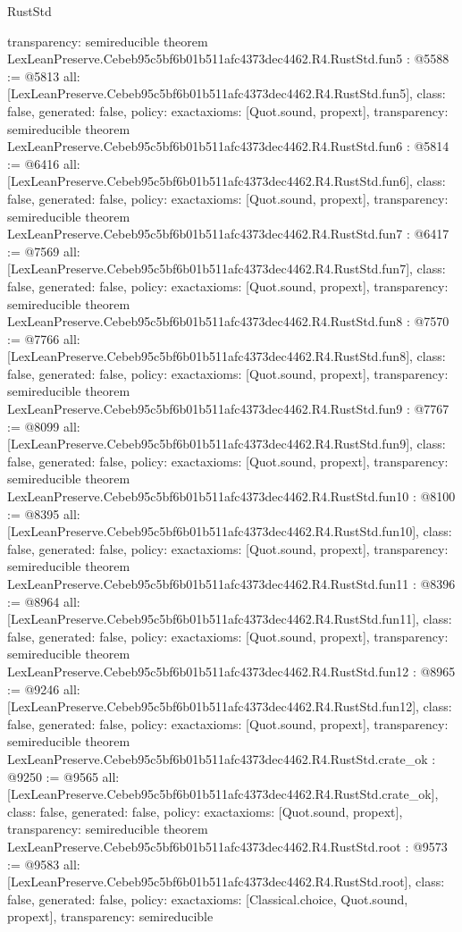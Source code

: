 \begin{lexlean}{RustStd}
\begin{coremodule}
{  transparency: semireducible
}
theorem LexLeanPreserve.Cebeb95c5bf6b01b511afc4373dec4462.R4.RustStd.fun5 : @5588 := @5813 {
  all: [LexLeanPreserve.Cebeb95c5bf6b01b511afc4373dec4462.R4.RustStd.fun5],
  class: false,
  generated: false,
  policy: exact{axioms: [Quot.sound, propext]},
  transparency: semireducible
}
theorem LexLeanPreserve.Cebeb95c5bf6b01b511afc4373dec4462.R4.RustStd.fun6 : @5814 := @6416 {
  all: [LexLeanPreserve.Cebeb95c5bf6b01b511afc4373dec4462.R4.RustStd.fun6],
  class: false,
  generated: false,
  policy: exact{axioms: [Quot.sound, propext]},
  transparency: semireducible
}
theorem LexLeanPreserve.Cebeb95c5bf6b01b511afc4373dec4462.R4.RustStd.fun7 : @6417 := @7569 {
  all: [LexLeanPreserve.Cebeb95c5bf6b01b511afc4373dec4462.R4.RustStd.fun7],
  class: false,
  generated: false,
  policy: exact{axioms: [Quot.sound, propext]},
  transparency: semireducible
}
theorem LexLeanPreserve.Cebeb95c5bf6b01b511afc4373dec4462.R4.RustStd.fun8 : @7570 := @7766 {
  all: [LexLeanPreserve.Cebeb95c5bf6b01b511afc4373dec4462.R4.RustStd.fun8],
  class: false,
  generated: false,
  policy: exact{axioms: [Quot.sound, propext]},
  transparency: semireducible
}
theorem LexLeanPreserve.Cebeb95c5bf6b01b511afc4373dec4462.R4.RustStd.fun9 : @7767 := @8099 {
  all: [LexLeanPreserve.Cebeb95c5bf6b01b511afc4373dec4462.R4.RustStd.fun9],
  class: false,
  generated: false,
  policy: exact{axioms: [Quot.sound, propext]},
  transparency: semireducible
}
theorem LexLeanPreserve.Cebeb95c5bf6b01b511afc4373dec4462.R4.RustStd.fun10 : @8100 := @8395 {
  all: [LexLeanPreserve.Cebeb95c5bf6b01b511afc4373dec4462.R4.RustStd.fun10],
  class: false,
  generated: false,
  policy: exact{axioms: [Quot.sound, propext]},
  transparency: semireducible
}
theorem LexLeanPreserve.Cebeb95c5bf6b01b511afc4373dec4462.R4.RustStd.fun11 : @8396 := @8964 {
  all: [LexLeanPreserve.Cebeb95c5bf6b01b511afc4373dec4462.R4.RustStd.fun11],
  class: false,
  generated: false,
  policy: exact{axioms: [Quot.sound, propext]},
  transparency: semireducible
}
theorem LexLeanPreserve.Cebeb95c5bf6b01b511afc4373dec4462.R4.RustStd.fun12 : @8965 := @9246 {
  all: [LexLeanPreserve.Cebeb95c5bf6b01b511afc4373dec4462.R4.RustStd.fun12],
  class: false,
  generated: false,
  policy: exact{axioms: [Quot.sound, propext]},
  transparency: semireducible
}
theorem LexLeanPreserve.Cebeb95c5bf6b01b511afc4373dec4462.R4.RustStd.crate_ok : @9250 := @9565 {
  all: [LexLeanPreserve.Cebeb95c5bf6b01b511afc4373dec4462.R4.RustStd.crate_ok],
  class: false,
  generated: false,
  policy: exact{axioms: [Quot.sound, propext]},
  transparency: semireducible
}
theorem LexLeanPreserve.Cebeb95c5bf6b01b511afc4373dec4462.R4.RustStd.root : @9573 := @9583 {
  all: [LexLeanPreserve.Cebeb95c5bf6b01b511afc4373dec4462.R4.RustStd.root],
  class: false,
  generated: false,
  policy: exact{axioms: [Classical.choice, Quot.sound, propext]},
  transparency: semireducible
}


\end{coremodule}
\end{lexlean}
